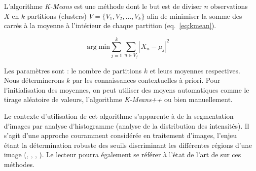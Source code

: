 		L'algorithme \emph{K-Means} est une méthode dont le but est de diviser $n$ observations $X$ en $k$ partitions (clusters) $V=\{V_1, V_2, …, V_k\}$ afin de minimiser la somme des carrés à la moyenne à l'intérieur de chaque partition (eq.~\ref{eq:kmean}).
		
		


 \begin{equation}
 	\mathrm{arg\;min} \sum_{j=1}^k \sum_{n \in V_j} \left| X_n - \mu_j \right|^2
 	\label{eq:kmean}
 \end{equation}
  

	Les paramètres sont : le nombre de partitions $k$ et leurs moyennes respectives. Nous déterminerons $k$ par les connaissances contextuelles à priori. Pour l'initialisation des moyennes, on peut utiliser des moyens automatiques comme le tirage aléatoire de valeurs, l'algorithme \emph{K-Means++}\citep[Arthur2007]{Arthur2007} ou bien manuellement. %

	Le contexte d'utilisation de cet algorithme s'apparente à de la segmentation d'images par analyse d'histogramme (analyse de la distribution des intensités). Il s'agit d'une approche couramment considérée en traitement d'images, l'enjeu étant la détermination robuste des seuils discriminant les différentes régions d'une image (\citep[Coudray]{Coudray2010}, \citep[Bhattacharyya]{Bhattacharyya2011}, \citep[Cheng]{Cheng1998}, \citep[Cuevas]{Cuevas2010}). Le lecteur pourra également se référer à l'état de l'art de \citep[Zhang]{Zhang2008} sur ces méthodes.

	\vspace{1em}
		
	
